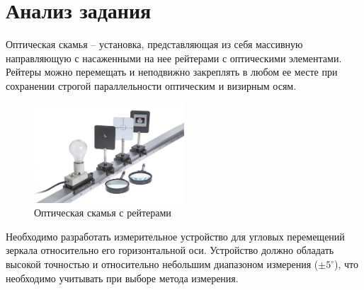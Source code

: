 \section{Анализ задания}
\label{sec:analys}

Оптическая скамья -- установка, представляющая из себя массивную направляющую с насаженными на нее рейтерами с оптическими элементами.
Рейтеры можно перемещать и неподвижно закреплять в любом ее месте при сохранении строгой параллельности оптическим и визирным осям.
\begin{figure}[!h]
    \centering
    \includegraphics[width=0.5\textwidth]{img/img}
    \caption{Оптическая скамья с рейтерами}
    \label{fig:img}
\end{figure}

Необходимо разработать измерительное устройство для угловых перемещений зеркала относительно его горизонтальной оси.
Устройство должно обладать высокой точностью и относительно небольшим диапазоном измерения ($\pm5^\circ$), что необходимо учитывать при выборе метода измерения.
